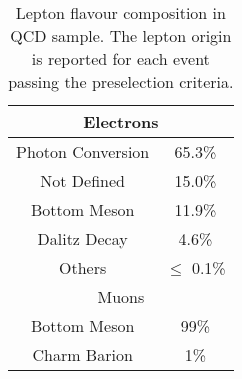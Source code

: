 \begin{table}[h!]
\centering
\begin{tabular}{|c|c|}
\hline\hline
\multicolumn{2}{c}{Electrons}\\\hline\hline
Photon Conversion  & 65.3\%  \\
Not Defined & 15.0\% \\
Bottom Meson & 11.9\% \\
Dalitz Decay &4.6\% \\
Others & $\le$ 0.1\% \\
\hline \hline
\multicolumn{2}{c}{Muons}\\\hline\hline
\hline \hline
Bottom Meson  & 99\% \\
Charm Barion  & 1\% \\
\hline\hline
\end{tabular}
\caption{Lepton flavour composition in QCD sample. The lepton origin is reported for each event passing the preselection criteria. }
\label{tab:LepFlav}
\end{table}

